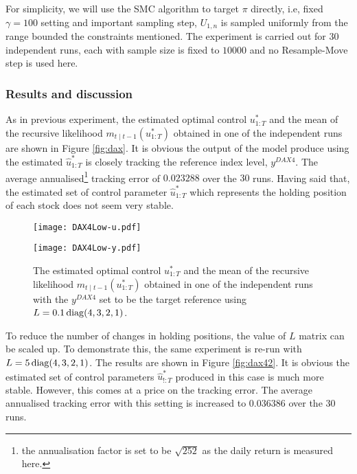 For simplicity, we will use the SMC algorithm to target $\pi$ directly, i.e, fixed $\gamma=100$ setting and important sampling step, $U_{1,n}$ is sampled uniformly from the range bounded the constraints mentioned. The experiment is carried out for $30$ independent runs, each with sample size is fixed to $10000$ and no Resample-Move step is used here.

\subsubsection{Results and discussion}
As in previous experiment, the estimated optimal control $u^*_{1:T}$ and the mean of the recursive likelihood $m_{t \mid t-1}(u^*_{1:T})$ obtained in one of the independent runs are shown in Figure \ref{fig:dax}.  It is obvious the output of the model produce using the estimated $\hat{u}^*_{1:T}$ is closely tracking the reference index level, $y^{DAX4}$. The average annualised\footnote{the annualisation factor is set to be $\sqrt{252}$ as the daily return is measured here.} tracking error of $0.023288$ over the $30$ runs. Having said that, the estimated set of control parameter $\hat{u}^*_{1:T}$ which represents the holding position of each stock does not seem very stable.

\begin{figure}[tbp]
\centering
    \begin{minipage}{0.5\textwidth}
        \centering
        \texttt{[image: DAX4Low-u.pdf]}
    \end{minipage}%
    \begin{minipage}{0.5\textwidth}
        \centering
        \texttt{[image: DAX4Low-y.pdf]}
    \end{minipage}
\caption{The estimated optimal control $u^*_{1:T}$ and the mean of the recursive likelihood $m_{t \mid t-1}(u^*_{1:T})$ obtained in one of the independent runs with the $y^{DAX4}$ set to be the target reference using $L = 0.1\operatorname{diag}(4,3,2,1)$.}
\label{fig:dax4}
\end{figure}

To reduce the number of changes in holding positions, the value of $L$ matrix can be scaled up. To demonstrate this, the same experiment is re-run with $L = 5\operatorname{diag}(4,3,2,1)$. The results are shown in Figure \ref{fig:dax42}. It is obvious the estimated set of control parameters $\hat{u}^*_{!:T}$ produced in this case is much more stable. However, this comes at a price on the tracking error. The average annualised tracking error with this setting is increased to $0.036386$ over the $30$ runs. 

